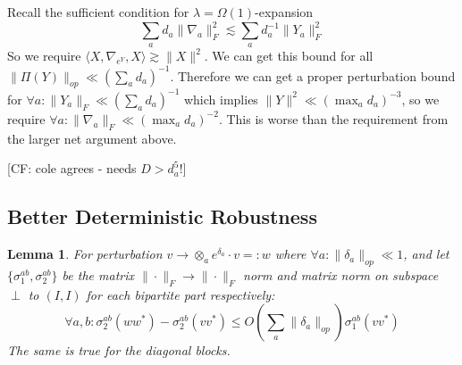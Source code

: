 \documentclass{article}
\newtheorem{lemma}[theorem]{Lemma}
\newcommand{\CF}[1]{{\color{purple}[CF: #1]}}
\begin{document}
Recall the sufficient condition for $\lambda = \Omega(1)$-expansion
\[ \sum_{a} d_{a} \|\nabla_{a}\|_{F}^{2} \lesssim \sum_{a} d_{a}^{-1} \|Y_{a}\|_{F}^{2}  \]
So we require $\langle X, \nabla_{e^{Y}}, X \rangle \gtrsim \|X\|^{2}$. We can get this bound for all $\|\Pi(Y)\|_{op} \ll (\sum_{a} d_{a})^{-1}$. Therefore we can get a proper perturbation bound for $\forall a: \|Y_{a}\|_{F} \ll (\sum_{a} d_{a})^{-1}$ which implies $\|Y\|^{2} \ll (\max_{a} d_{a})^{-3}$, so we require $\forall a: \|\nabla_{a}\|_{F} \ll (\max_{a} d_{a})^{-2}$. This is worse than the requirement from the larger net argument above.

\CF{cole agrees - needs $D > d_a^5!$}

\subsection{Better Deterministic Robustness}
\begin{lemma}\label{lem:block-perturbation-appendix}
For perturbation $v \to \otimes_{a} e^{\delta_{a}} \cdot v =: w$ where $\forall a: \|\delta_{a}\|_{op} \ll 1$, and let $\{\sigma_{1}^{ab}, \sigma_{2}^{ab}\}$ be the matrix $\|\cdot\|_{F} \to \|\cdot\|_{F}$ norm and matrix norm on subspace $\perp$ to $(I,I)$ for each bipartite part respectively:
\[ \forall a,b: \sigma_{2}^{ab}(w w^{*}) - \sigma_{2}^{ab}(v v^{*}) \leq O \left( \sum_{a} \|\delta_{a}\|_{op}  \right) \sigma_{1}^{ab}(v v^{*})   \]
The same is true for the diagonal blocks.
\end{lemma}
\end{document}
